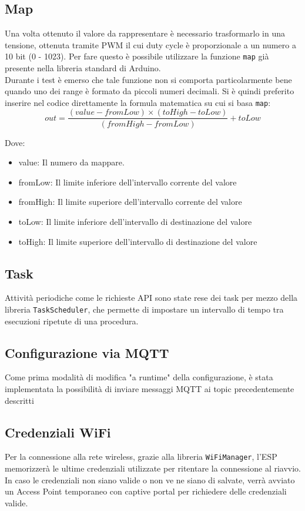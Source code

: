 \documentclass[12pt,a4paper]{report}
\begin{document}
\subsection{Map}
Una volta ottenuto il valore da rappresentare è necessario trasformarlo in una tensione, ottenuta tramite PWM il cui duty cycle è
proporzionale a un numero a 10 bit (0 - 1023). Per fare questo è possibile utilizzare la funzione \texttt{map} già presente nella
libreria standard di Arduino.\\
Durante i test è emerso che tale funzione non si comporta particolarmente bene quando uno dei range è formato da piccoli numeri
decimali. Si è quindi preferito inserire nel codice direttamente la formula matematica su cui si basa \texttt{map}:
\[out = \frac{(value - fromLow) \times (toHigh - toLow)}{(fromHigh - fromLow)} + toLow \]

\noindent Dove:\cite{arduinomap}
\begin{itemize}
  \item value: Il numero da mappare.
  \item fromLow: Il limite inferiore dell'intervallo corrente del valore
  \item fromHigh: Il limite superiore dell'intervallo corrente del valore
  \item toLow: Il limite inferiore dell'intervallo di destinazione del valore
  \item toHigh: Il limite superiore dell'intervallo di destinazione del valore
\end{itemize}

\subsection{Task}
Attività periodiche come le richieste API sono state rese dei task per mezzo della libreria \texttt{TaskScheduler}, che permette di
impostare un intervallo di tempo tra esecuzioni ripetute di una procedura.

\subsection{Configurazione via MQTT}
Come prima modalità di modifica "a runtime" della configurazione, è stata implementata la possibilità di inviare messaggi MQTT ai
topic precedentemente descritti

\subsection{Credenziali WiFi}
Per la connessione alla rete wireless, grazie alla libreria \texttt{WiFiManager}, l'ESP memorizzerà le ultime credenziali utilizzate
per ritentare la connessione al riavvio. In caso le credenziali non siano valide o non ve ne siano di salvate, verrà avviato un
Access Point temporaneo con captive portal per richiedere delle credenziali valide.
\end{document}

